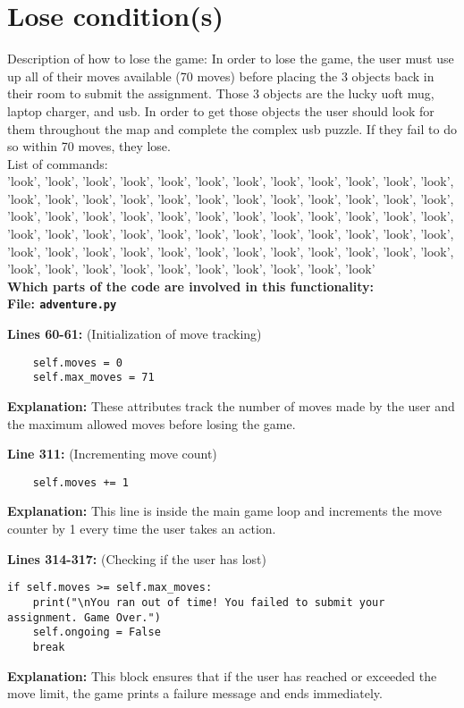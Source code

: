 \documentclass[11pt]{article}
\begin{document}
\section*{Lose condition(s)}
Description of how to lose the game:
In order to lose the game, the user must use up all of their moves available (70 moves) before placing the 3 objects
back in their room to submit the assignment. Those 3 objects are the lucky uoft mug, laptop charger, and usb. In order
to get those objects the user should look for them throughout the map and complete the complex usb puzzle. If they fail
to do so within 70 moves, they lose. \\
List of commands: \\
'look', 'look', 'look', 'look', 'look', 'look', 'look', 'look', 'look', 'look', 'look', 'look', 'look', 'look', 'look',
'look', 'look', 'look', 'look', 'look', 'look', 'look', 'look', 'look', 'look', 'look', 'look', 'look', 'look', 'look',
'look', 'look', 'look', 'look', 'look', 'look', 'look', 'look', 'look', 'look', 'look', 'look', 'look', 'look', 'look',
'look', 'look', 'look', 'look', 'look', 'look', 'look', 'look', 'look', 'look', 'look', 'look', 'look', 'look', 'look',
'look', 'look', 'look', 'look', 'look', 'look', 'look', 'look', 'look', 'look' \\
\textbf{Which parts of the code are involved in this functionality:} \\

\textbf{File: \texttt{adventure.py}}

\noindent\textbf{Lines 60-61:} (Initialization of move tracking)
\begin{verbatim}
    self.moves = 0
    self.max_moves = 71
\end{verbatim}
\textbf{Explanation:} These attributes track the number of moves made by the user and the maximum allowed moves before
losing the game.

\noindent\textbf{Line 311:} (Incrementing move count)
\begin{verbatim}
    self.moves += 1
\end{verbatim}
\textbf{Explanation:} This line is inside the main game loop and increments the move counter by 1 every time the user
takes an action.

\noindent\textbf{Lines 314-317:} (Checking if the user has lost)
\begin{verbatim}
if self.moves >= self.max_moves:
    print("\nYou ran out of time! You failed to submit your assignment. Game Over.")
    self.ongoing = False
    break
\end{verbatim}
\textbf{Explanation:} This block ensures that if the user has reached or exceeded the move limit, the game prints a
failure message and ends immediately.
\end{document}
